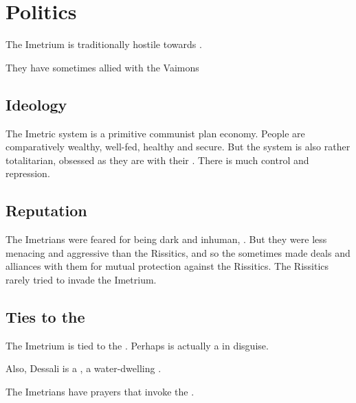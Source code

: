 \section{Politics}
The Imetrium is traditionally hostile towards . 

They have sometimes allied with the  Vaimons





\subsection{Ideology}
The Imetric system is a primitive communist plan economy. 
People are comparatively wealthy, well-fed, healthy and secure. 
But the system is also rather totalitarian, obsessed as they are with their . 
There is much control and repression. 





\subsection{Reputation}
The Imetrians were feared for being dark and inhuman, .
But they were less menacing and aggressive than the Rissitics, and so the \Velcadians sometimes made deals and alliances with them for mutual protection against the Rissitics.
The Rissitics rarely tried to invade the Imetrium.





\subsection{Ties to the \nagae}
The Imetrium is tied to the \nagae. 
Perhaps \Sarokash is actually a \nagalord{} in disguise. 

Also, Dessali is a \naiad, a water-dwelling . 

The Imetrians have prayers that invoke the \nagae. 









